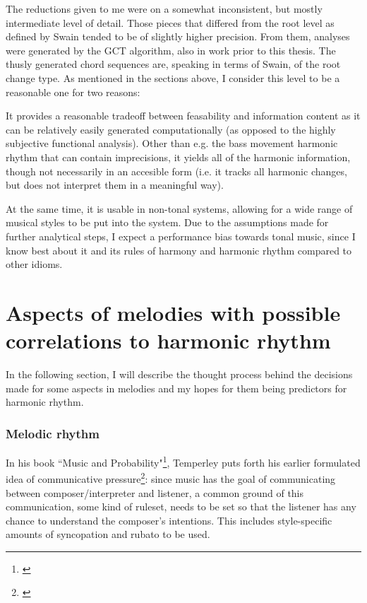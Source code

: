 \documentclass[a4paper,12pt]{report}
\begin{document}
The reductions given to me were on a somewhat inconsistent, but mostly intermediate level of detail. Those pieces that differed from the root level as defined by Swain tended to be of slightly higher precision. From them, analyses were generated by the GCT algorithm, also in work prior to this thesis. The thusly generated chord sequences are, speaking in terms of Swain, of the root change type. As mentioned in the sections above, I consider this level to be a reasonable one for two reasons:

It provides a reasonable tradeoff between feasability and information content as it can be relatively easily generated computationally (as opposed to the highly subjective functional analysis). Other than e.g. the bass movement harmonic rhythm that can contain imprecisions, it yields all of the harmonic information, though not necessarily in an accesible form (i.e. it tracks all harmonic changes, but does not interpret them in a meaningful way).

At the same time, it is usable in non-tonal systems, allowing for a wide range of musical styles to be put into the system. Due to the assumptions made for further analytical steps, I expect a performance bias towards tonal music, since I know best about it and its rules of harmony and harmonic rhythm compared to other idioms.


\section{Aspects of melodies with possible correlations to harmonic rhythm}
In the following section, I will describe the thought process behind the decisions made for some aspects in melodies and my hopes for them being predictors for harmonic rhythm.

\subsubsection{Melodic rhythm}
In his book ``Music and Probability"\footnote{\cite{temperley2007music}}, Temperley puts forth his earlier formulated idea of communicative pressure\footnote{\cite{temperley2004communicative}}: since music has the goal of communicating between composer/interpreter and listener, a common ground of this communication, some kind of ruleset, needs to be set so that the listener has any chance to understand the composer's intentions. This includes style-specific amounts of syncopation and rubato to be used.
\end{document}
